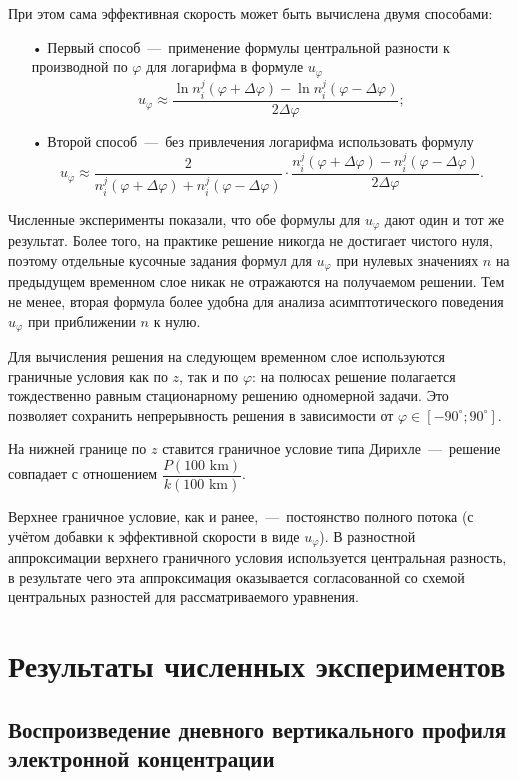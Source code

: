 \documentclass[14pt, a4paper, fleqn]{extarticle}
\begin{document}
\smallskip

При этом сама эффективная скорость может быть вычислена двумя способами: 
\begin{itemize}
\item[•] Первый способ~---~применение формулы центральной разности к производной по $\varphi$ для логарифма в формуле $u_\varphi$ $$u_\varphi\approx \dfrac{\ln n^j_i(\varphi+\Delta\varphi)-\ln n^j_i(\varphi-\Delta\varphi)}{2\Delta\varphi};$$ 
\item[•] Второй способ~---~без привлечения логарифма использовать формулу $$u_\varphi \approx \dfrac{2}{n_i^j(\varphi+\Delta\varphi)+n_i^j(\varphi-\Delta\varphi)}\cdot\dfrac{n_i^j(\varphi+\Delta\varphi)-n_i^j(\varphi-\Delta\varphi)}{2\Delta\varphi}.$$
\end{itemize}

Численные эксперименты показали, что обе формулы для $u_\varphi$ дают один и тот же результат. Более того, на практике решение никогда не достигает чистого нуля, поэтому отдельные кусочные задания формул для $u_\varphi$ при нулевых значениях $n$ на предыдущем временном слое никак не отражаются на получаемом решении. Тем не менее, вторая формула более удобна для анализа асимптотического поведения $u_\varphi$ при приближении $n$ к нулю.

Для вычисления решения на следующем временном слое используются граничные условия как по $z$, так и по $\varphi$: на полюсах решение полагается тождественно равным стационарному решению одномерной задачи. Это позволяет сохранить непрерывность решения в зависимости от $\varphi \in [-90^\circ; 90^\circ]$. 

На нижней границе по $z$ ставится граничное условие типа Дирихле~---~решение совпадает с отношением $\dfrac{P(100\mbox{ km})}{k(100\mbox{ km})}$. 

Верхнее граничное условие, как и ранее,~---~постоянство полного потока (с учётом добавки к эффективной скорости в виде $u_\varphi$). В разностной аппроксимации верхнего граничного условия используется центральная разность, в результате чего эта аппроксимация оказывается согласованной со схемой центральных разностей для рассматриваемого уравнения.


\section{Результаты численных экспериментов}

\subsection{Воспроизведение дневного вертикального профиля электронной концентрации}
\end{document}
